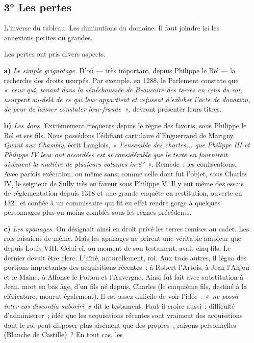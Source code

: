 \documentclass[french,twoside]{book} %
\newcommand{\labelchar}[1]{\textbf{\color{rubric} #1}}
\begin{document}
\subsection[{3° Les pertes}]{3° Les pertes}
\label{c03c3}
\noindent L’inverse du tableau. Les diminutions du domaine. Il faut joindre ici les annexions petites ou grandes.\par
Les pertes ont pris divers aspects.\par
\bigbreak
\noindent \labelchar{a)} {\itshape Le simple grignotage.} D’où — très important, depuis Philippe le Bel — la recherche des droits usurpés. Par exemple, en 1288, le Parlement constate que \emph{« ceux qui, tenant dans la sénéchaussée de Beaucaire des terres en cens du roi, usurpent au-delà de ce qui leur appartient et refusent d’exhiber l’acte de donation, de peur de laisser constater leur fraude »}, devront présenter leurs titres.\par
\bigbreak
\noindent \labelchar{b)} {\itshape Les dons.} Extrêmement fréquents depuis le règne des favoris, sous Philippe le Bel et ses fils. Nous possédons l’édifiant cartulaire d’Enguerrand de Marigny. \emph{Quant aux Chambly}, écrit Langlois, \emph{« l’ensemble des chartes... que Philippe III et Philippe IV leur ont accordées est si considérable que le texte en fournirait aisément la matière de plusieurs volumes in-8° »}. Remède : les confiscations. Avec parfois exécution, ou même sans, comme celle dont fut l’objet, sous Charles IV, le seigneur de Sully très en faveur sous Philippe V. Il y eut même des essais de réglementation depuis 1318 et une grande enquête en restitution, ouverte en 1321 et confiée à un commissaire qui fit en effet rendre gorge à quelques personnages plus ou moins comblés sous les règnes précédents.\par
\bigbreak
\noindent \labelchar{c)} {\itshape Les apanages.} On désignait ainsi en droit privé les terres remises au cadet. Les rois faisaient de même. Mais les apanages ne prirent une véritable ampleur que depuis Louis VIII. Celui-ci, au moment de son testament, avait cinq fils. Le dernier devait être clerc. L’aîné, naturellement, roi. Aux trois autres, il légua des portions importantes des acquisitions récentes : à Robert l’Artois, à Jean l’Anjou et le Maine, à Alfonse le Poitou et l’Auvergne. Ainsi fut fait avec substitution à Jean, mort en bas âge, d’un fils né depuis, Charles (le cinquième fils, destiné à la cléricature, mourut également). Il est assez difficile de voir l’idée : \emph{« ne possit inter eos discordia suboriri »} dit le testament. Faut-il croire aussi : difficulté d’administrer ; idée que les acquisitions récentes sont vraiment des acquisitions dont le roi peut disposer plus aisément que des propres ; raisons personnelles (Blanche de Castille) ? En tout cas, les  
\end{document}
